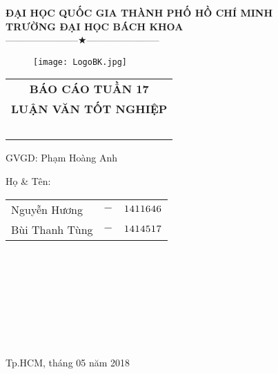 \documentclass[12pt,a4paper]{article}
\begin{document}
\begin{titlepage}
\begin{flushleft}
\begin{center}
\textbf{\Large ĐẠI HỌC QUỐC GIA THÀNH PHỐ HỒ CHÍ MINH}\\
\textbf{\Large TRƯỜNG ĐẠI HỌC BÁCH KHOA}\\
-----------------------$\bigstar$-----------------------
\end{center}
\end{flushleft}
\vspace{1cm}
\begin{figure}[h!]
\begin{center}
\texttt{[image: LogoBK.jpg]}
\end{center}
\end{figure}
\vspace{1cm}
\begin{center}
\begin{tabular}{c}
\hline
\textbf{{\large BÁO CÁO TUẦN 17}}\\
\multicolumn{1}{l}{\textbf{{\LARGE LUẬN VĂN TỐT NGHIỆP}}}\\
~~\\
\hline
\end{tabular}

\end{center}
\vspace{2cm}
\begin{minipage}[t]{0.650\linewidth}
GVGD: Phạm Hoàng Anh
\end{minipage}
\begin{minipage}[t]{0.90\linewidth}
Họ \& Tên:\\
\begin{tabular}{lcl}
Nguyễn Hương  &$\displaystyle{-}$& $\textsc{1411646}$ \\
Bùi Thanh Tùng  &$\displaystyle{-}$& $\textsc{1414517}$ \\

\end{tabular} 
\end{minipage}
\\ \\ \\ \\ \\ \\ \\

\vspace{3cm}
\begin{center}
\begin{center}
Tp.HCM, tháng 05 năm 2018
\end{center}
\end{center}
\end{titlepage}
\newpage
\begin{center}
{\color{blue}  {\tableofcontents}}
 \end{center} %
\newpage
\end{document}
